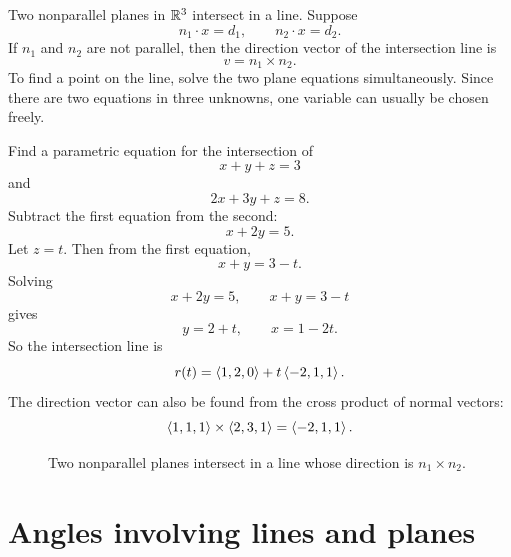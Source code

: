 Two nonparallel planes in $\mathbb{R}^3$ intersect in a line. Suppose
\[
  n_1\cdot x=d_1,\qquad n_2\cdot x=d_2.
\]
If $n_1$ and $n_2$ are not parallel, then the direction vector of the intersection line is
\[
  v=n_1\times n_2.
\]
To find a point on the line, solve the two plane equations simultaneously. Since there are two equations in three unknowns, one variable can usually be chosen freely.

\begin{examplebox}[title={Example 4.8: Intersection of two planes}]
Find a parametric equation for the intersection of
\[
  x+y+z=3
\]
and
\[
  2x+3y+z=8.
\]
Subtract the first equation from the second:
\[
  x+2y=5.
\]
Let $z=t$. Then from the first equation,
\[
  x+y=3-t.
\]
Solving
\[
  x+2y=5,\qquad x+y=3-t
\]
gives
\[
  y=2+t,\qquad x=1-2t.
\]
So the intersection line is
\[
  r(t)=\left\langle 1,2,0\right\rangle+t\left\langle -2,1,1\right\rangle.
\]
The direction vector can also be found from the cross product of normal vectors:
\[
  \left\langle 1,1,1\right\rangle\times\left\langle 2,3,1\right\rangle=\left\langle -2,1,1\right\rangle.
\]
\end{examplebox}

\begin{figure}[H]
\centering
{}
\caption{Two nonparallel planes intersect in a line whose direction is $n_1\times n_2$.}
\end{figure}

\section{Angles involving lines and planes}

